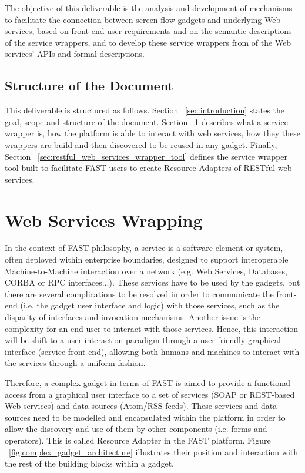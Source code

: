 \documentclass{fast_latex}
\begin{document}
The objective of this deliverable is the analysis and development of mechanisms to facilitate the connection between screen-flow gadgets and underlying Web services, based on front-end user requirements and on the semantic descriptions of the service wrappers, and to develop these service wrappers from of the Web services' APIs and formal descriptions.


\subsection{Structure of the Document} %
\label{sub:structure_of_the_document}

This deliverable is structured as follows. Section ~\ref{sec:introduction} states the goal, scope and structure of the document. Section ~\ref{sec:web_services_wrapping} describes what a service wrapper is, how the platform is able to interact with web services, how they these wrappers are build and then discovered to be reused in any gadget. Finally, Section ~\ref{sec:restful_web_services_wrapper_tool} defines the service wrapper tool built to facilitate FAST users to create Resource Adapters of RESTful web services.


\clearpage
\section{Web Services Wrapping} %
\label{sec:web_services_wrapping}

In the context of FAST philosophy, a service is a software element or system, often deployed within enterprise boundaries, designed to support interoperable Machine-to-Machine interaction over a network (e.g. Web Services, Databases, CORBA or RPC interfaces...). These services have to be used by the gadgets, but there are several complications to be resolved in order to communicate the front-end (i.e. the gadget user interface and logic) with those services, such as the disparity of interfaces and invocation mechanisms. Another issue is the complexity for an end-user to interact with those services. Hence, this interaction will be shift to a user-interaction paradigm through a user-friendly graphical interface (service front-end), allowing both humans and machines to interact with the services through a uniform fashion.

Therefore, a complex gadget in terms of FAST is aimed to provide a functional access from a graphical user interface to a set of services (SOAP or REST-based Web services) and data sources (Atom/RSS feeds). These services and data sources need to be modelled and encapsulated within the platform in order to allow the discovery and use of them by other components (i.e. forms and operators). This is called Resource Adapter in the FAST platform. Figure ~\ref{fig:complex_gadget_architecture} illustrates their position and interaction with the rest of the building blocks within a gadget.
\end{document}
